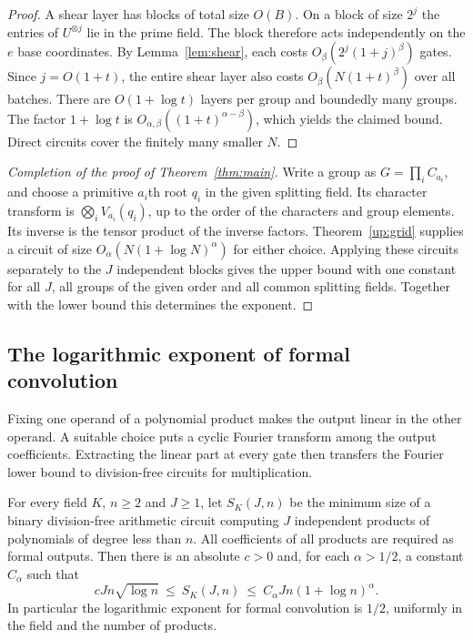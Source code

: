 \begin{proof}
A shear layer has blocks of total size \(O(B)\). On a block of size
\(2^j\) the entries of \(U^{\otimes j}\) lie in the prime field.
The block therefore acts independently on the \(e\) base coordinates.
By Lemma~\ref{lem:shear}, each costs \(O_\beta(2^j(1+j)^\beta)\)
gates. Since \(j=O(1+t)\), the entire shear layer also costs
\(O_\beta(N(1+t)^\beta)\) over all batches. There are \(O(1+\log t)\)
layers per group and boundedly many groups. The factor \(1+\log t\)
is \(O_{\alpha,\beta}((1+t)^{\alpha-\beta})\), which yields the claimed
bound. Direct circuits cover the finitely many smaller \(N\).
\end{proof}

\begin{proof}[Completion of the proof of Theorem~\ref{thm:main}]
Write a group as \(G=\prod_i C_{a_i}\), and choose a primitive
\(a_i\)th root \(q_i\) in the given splitting field. Its character
transform is \(\bigotimes_i V_{a_i}(q_i)\), up to the order of the
characters and group elements. Its inverse is the tensor product of the inverse factors. Theorem~\ref{up:grid} supplies a circuit
of size \(O_\alpha(N(1+\log N)^\alpha)\) for either choice. Applying
these circuits separately to the \(J\) independent blocks gives the
upper bound with one constant for all \(J\), all groups of the given
order and all common splitting fields. Together with the lower bound
this determines the exponent.
\end{proof}

\subsection{The logarithmic exponent of formal convolution}

Fixing one operand of a polynomial product makes the output linear in
the other operand. A suitable choice puts a cyclic Fourier transform
among the output coefficients. Extracting the linear part at every gate
then transfers the Fourier lower bound to division-free circuits for
multiplication.

\begin{corollary}\label{cor:conv-exponent}
For every field \(K\), \(n\ge2\) and \(J\ge1\), let \(S_K(J,n)\) be
the minimum size of a binary division-free arithmetic circuit computing
\(J\) independent products of polynomials of degree less than \(n\).
All coefficients of all products are required as formal outputs. Then
there is an absolute \(c>0\) and, for each \(\alpha>1/2\), a constant
\(C_\alpha\) such that
\[
       cJn\sqrt{\log n}\ \le\ S_K(J,n)\
                  \le\ C_\alpha Jn(1+\log n)^\alpha .
\]
In particular the logarithmic exponent for formal convolution is
\(1/2\), uniformly in the field and the number of products.
\end{corollary}

